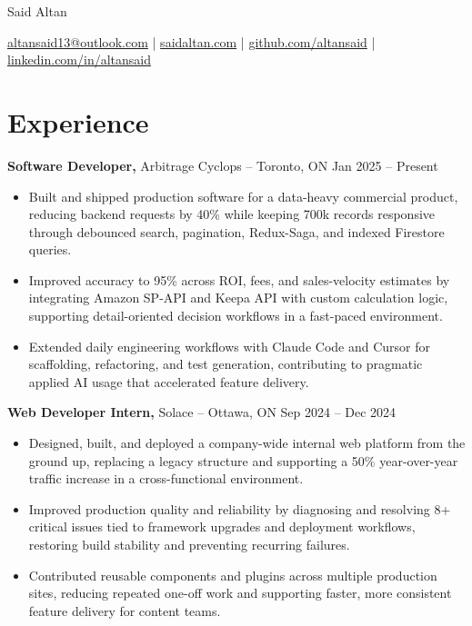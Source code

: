 \documentclass[11pt]{article}       %
\begin{document}
\centerline{\Huge Said Altan}

\vspace{10pt}

\centerline{\href{mailto:altansaid13@outlook.com}{altansaid13@outlook.com} | \href{https://saidaltan.com}{saidaltan.com} | \href{https://github.com/altansaid}{github.com/altansaid} | \href{https://www.linkedin.com/in/altansaid}{linkedin.com/in/altansaid}}


\vspace{5pt}
\section*{Experience}
\textbf{Software Developer,} {Arbitrage Cyclops} -- Toronto, ON \hfill Jan 2025 -- Present \\
\vspace{-9pt}
\begin{itemize}
  \item Built and shipped production software for a data-heavy commercial product, reducing backend requests by 40\% while keeping 700k records responsive through debounced search, pagination, Redux-Saga, and indexed Firestore queries.
  \item Improved accuracy to 95\% across ROI, fees, and sales-velocity estimates by integrating Amazon SP-API and Keepa API with custom calculation logic, supporting detail-oriented decision workflows in a fast-paced environment.
  \item Extended daily engineering workflows with Claude Code and Cursor for scaffolding, refactoring, and test generation, contributing to pragmatic applied AI usage that accelerated feature delivery.
\end{itemize}

\textbf{Web Developer Intern,} {Solace} -- Ottawa, ON \hfill Sep 2024 -- Dec 2024 \\
\vspace{-9pt}
\begin{itemize}
  \item Designed, built, and deployed a company-wide internal web platform from the ground up, replacing a legacy structure and supporting a 50\% year-over-year traffic increase in a cross-functional environment.
  \item Improved production quality and reliability by diagnosing and resolving 8+ critical issues tied to framework upgrades and deployment workflows, restoring build stability and preventing recurring failures.
  \item Contributed reusable components and plugins across multiple production sites, reducing repeated one-off work and supporting faster, more consistent feature delivery for content teams.
\end{itemize}
\end{document}
